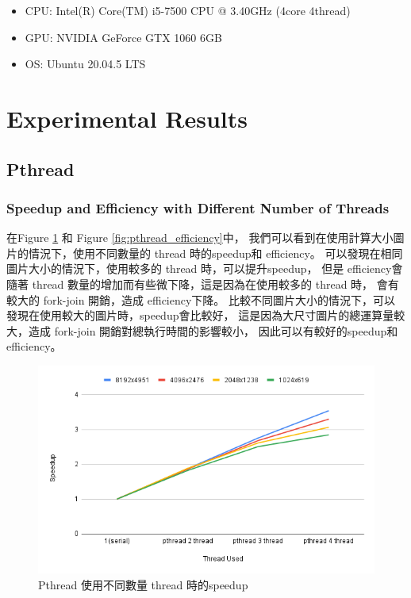 \documentclass[sigconf,nonacm]{acmart}
\begin{document}
\begin{itemize}
  \item CPU: Intel(R) Core(TM) i5-7500 CPU @ 3.40GHz (4core 4thread)
  \item GPU: NVIDIA GeForce GTX 1060 6GB
  \item OS: Ubuntu 20.04.5 LTS
\end{itemize}

\section{Experimental Results}

\subsection{Pthread}

\subsubsection{Speedup and Efficiency with Different Number of Threads}

在Figure \ref{fig:pthread_speedup} 和 Figure \ref{fig:pthread_efficiency}中，
我們可以看到在使用計算大小圖片的情況下，使用不同數量的 thread 時的speedup和 efficiency。
可以發現在相同圖片大小的情況下，使用較多的 thread 時，可以提升speedup，
但是 efficiency會隨著 thread 數量的增加而有些微下降，這是因為在使用較多的 thread 時，
會有較大的 fork-join 開銷，造成 efficiency下降。
比較不同圖片大小的情況下，可以發現在使用較大的圖片時，speedup會比較好，
這是因為大尺寸圖片的總運算量較大，造成 fork-join 開銷對總執行時間的影響較小，
因此可以有較好的speedup和 efficiency。

\begin{figure}[htbp]
  \centering
  \includegraphics[width=\linewidth]{"./image/pthread_speedup.png"}
  \caption{Pthread 使用不同數量 thread 時的speedup}
  \label{fig:pthread_speedup}
\end{figure}
\end{document}
